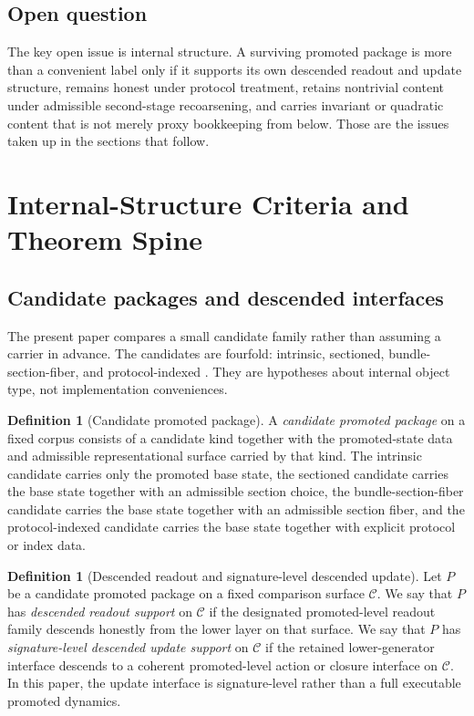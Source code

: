 \documentclass[11pt]{article}
\theoremstyle{definition}
\newtheorem{definition}[theorem]{Definition}
\begin{document}
\subsection{Open question}

The key open issue is internal structure. A surviving promoted package is more than a convenient label only if it supports its own descended readout and update structure, remains honest under protocol treatment, retains nontrivial content under admissible second-stage recoarsening, and carries invariant or quadratic content that is not merely proxy bookkeeping from below. Those are the issues taken up in the sections that follow.
 \section{Internal-Structure Criteria and Theorem Spine}

\subsection{Candidate packages and descended interfaces}

The present paper compares a small candidate family rather than assuming a carrier in advance. The candidates are fourfold: intrinsic, sectioned, bundle-section-fiber, and protocol-indexed \cite{Tsiokos2026PromotionCriteria}. They are hypotheses about internal object type, not implementation conveniences.

\begin{definition}[Candidate promoted package]
\label{def:candidate-package}
A \emph{candidate promoted package} on a fixed corpus consists of a candidate kind together with the promoted-state data and admissible representational surface carried by that kind. The intrinsic candidate carries only the promoted base state, the sectioned candidate carries the base state together with an admissible section choice, the bundle-section-fiber candidate carries the base state together with an admissible section fiber, and the protocol-indexed candidate carries the base state together with explicit protocol or index data.
\end{definition}

\begin{definition}[Descended readout and signature-level descended update]
\label{def:descended-interfaces}
Let $P$ be a candidate promoted package on a fixed comparison surface $\mathcal C$. We say that $P$ has \emph{descended readout support} on $\mathcal C$ if the designated promoted-level readout family descends honestly from the lower layer on that surface. We say that $P$ has \emph{signature-level descended update support} on $\mathcal C$ if the retained lower-generator interface descends to a coherent promoted-level action or closure interface on $\mathcal C$. In this paper, the update interface is signature-level rather than a full executable promoted dynamics.
\end{definition}
\end{document}
